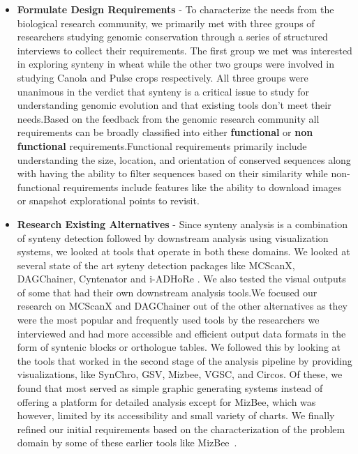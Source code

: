 \begin{itemize}
    
    \item \textbf{Formulate Design Requirements} -
    To characterize the needs from the biological research community, we primarily met with three groups of researchers studying genomic conservation through a series of structured interviews to collect their requirements. The first group we met was interested in exploring synteny in wheat while the other two groups were involved in studying Canola and Pulse crops respectively. All three groups were unanimous in the verdict that synteny is a critical issue to study for understanding genomic evolution and that existing tools don't meet their needs.Based on the feedback from the genomic research community all requirements can be broadly classified into either \textbf{functional} or \textbf{non functional} requirements.Functional requirements primarily include understanding the size, location, and orientation of conserved sequences along with having the ability to filter sequences based on their similarity while non-functional requirements include features like the ability to download images or snapshot explorational points to revisit.
    
    \item \textbf{Research Existing Alternatives} - 
    Since synteny analysis is a combination of synteny detection followed by downstream analysis using visualization systems, we looked at tools that operate in both these domains. We looked at several state of the art syteny detection packages like MCScanX, DAGChainer, Cyntenator and i-ADHoRe \cite{wang2012mcscanx,haas2004dagchainer,rodelsperger2010cyntenator,proost2011adhore}. We also tested the visual outputs of some that had their own downstream analysis tools.We focused our research on MCScanX and DAGChainer out of the other alternatives as they were the most popular and frequently used tools by the researchers we interviewed and had more accessible and  efficient output data formats in the form of syntenic blocks or orthologue tables. We followed this by looking at the tools that worked in the second stage of the analysis pipeline by providing visualizations, like SynChro, GSV, Mizbee, VGSC, and Circos\cite{drillon2014synchro,revanna2011gsv,Meyer2009,xu2016vgsc}. Of these, we found that most served as simple graphic generating systems instead of offering a platform for detailed analysis except for MizBee, which was however, limited by its accessibility and small variety of charts. We finally refined our initial requirements based on the characterization of the problem domain by some of these earlier tools like MizBee~\cite{Meyer2009}.


\end{itemize}

